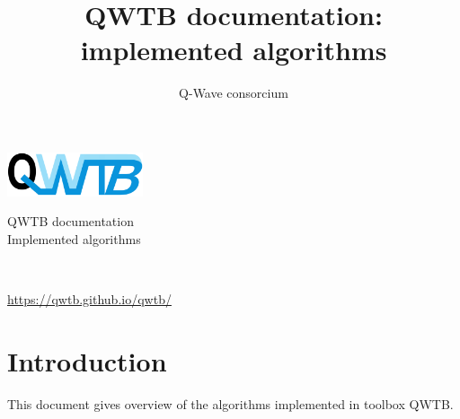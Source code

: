 \documentclass[12pt,a4paper,oneside]{report} %
\begin{document}
\renewcommand\floatpagefraction{.9} \renewcommand\topfraction{.9} \renewcommand\bottomfraction{.9} \renewcommand\textfraction{.1} \setcounter{totalnumber}{50} \setcounter{topnumber}{50} \setcounter{bottomnumber}{50} %
\renewcommand{\labelitemi}{--}          %
\setlength{\unitlength}{1mm}            %

\newenvironment{tightdesc}{\begin{description}[itemsep=0pt]} 
                              {\end{description}}

\def\infosection{Description}
\def\examplesection{Example}
\renewcommand{\chaptername}{}

\title{QWTB documentation: implemented algorithms}
\author{Q-Wave consorcium}

\thispagestyle{empty}
\begin{center}
        \vspace*{10em}
        {\huge
        \includegraphics[width=0.3\textwidth]{logo/qwtb_logo.png}

        \vspace{2.0em}
        QWTB documentation\\

        \vspace{1.5em}
        Implemented algorithms}\\

        \vfill
        {\Large \color{red}{QWTB version 0.1}}

        \vspace{1em}
        {\Large \url{https://qwtb.github.io/qwtb/}}
\end{center}
\newpage

\tableofcontents

\chapter{Introduction} %
This document gives overview of the algorithms implemented in toolbox QWTB.
\end{document}
